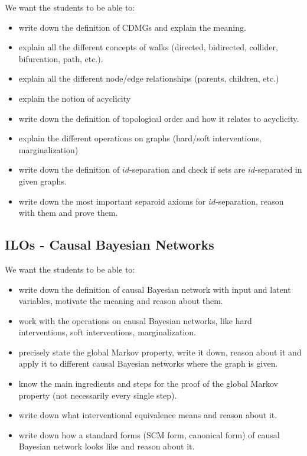 We want the students to be able to:
\begin{itemize}
\item write down the definition of CDMGs and explain the meaning.
\item explain all the different concepts of walks (directed, bidirected, collider, bifurcation, path, etc.).
\item explain all the different node/edge relationships (parents, children, etc.)
\item explain the notion of acyclicity
\item write down the definition of topological order and how it relates to acyclicity.
\item explain the different operations on graphs (hard/soft interventions, marginalization)
\item write down the definition of $id$-separation and check if sets are $id$-separated in given graphs.
\item write down the most important separoid axioms for $id$-separation, reason with them and prove them.
\end{itemize}


\subsection*{ILOs - Causal Bayesian Networks}

We want the students to be able to:
\begin{itemize}
\item write down the definition of causal Bayesian network with input and latent variables, motivate the meaning and reason about them.
\item work with the operations on causal Bayesian networks, like hard interventions, soft interventions, marginalization.
\item precisely state the global Markov property, write it down, reason about it and apply it to different causal Bayesian networks where the graph is given.
\item know the main ingredients and steps for the proof of the global Markov property (not necessarily every single step).
\item write down what interventional equivalence means and reason about it.
\item write down how a standard forms (SCM form, canonical form) of causal Bayesian network looks like and reason about it.
\end{itemize}


